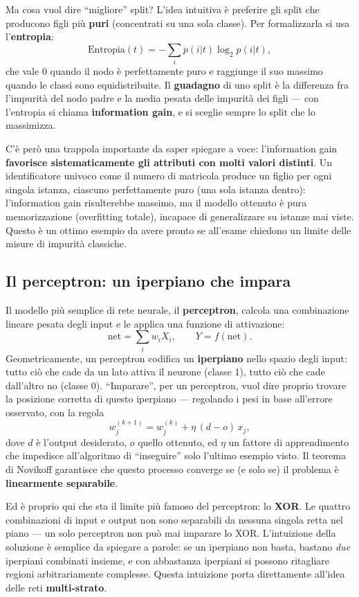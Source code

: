 \documentclass[11pt,a4paper]{article}
\begin{document}
Ma cosa vuol dire ``migliore'' split? L'idea intuitiva è preferire gli split che producono figli più \textbf{puri} (concentrati su una sola classe). Per formalizzarla si usa l'\textbf{entropia}:
\[
\text{Entropia}(t) = -\sum_i p(i|t)\log_2 p(i|t),
\]
che vale $0$ quando il nodo è perfettamente puro e raggiunge il suo massimo quando le classi sono equidistribuite. Il \textbf{guadagno} di uno split è la differenza fra l'impurità del nodo padre e la media pesata delle impurità dei figli --- con l'entropia si chiama \textbf{information gain}, e si sceglie sempre lo split che lo massimizza.

C'è però una trappola importante da saper spiegare a voce: l'information gain \textbf{favorisce sistematicamente gli attributi con molti valori distinti}. Un identificatore univoco come il numero di matricola produce un figlio per ogni singola istanza, ciascuno perfettamente puro (una sola istanza dentro): l'information gain risulterebbe massimo, ma il modello ottenuto è pura memorizzazione (overfitting totale), incapace di generalizzare su istanze mai viste. Questo è un ottimo esempio da avere pronto se all'esame chiedono un limite delle misure di impurità classiche.

\subsection{Il perceptron: un iperpiano che impara}

Il modello più semplice di rete neurale, il \textbf{perceptron}, calcola una combinazione lineare pesata degli input e le applica una funzione di attivazione:
\[
\text{net} = \sum_i w_i X_i, \qquad Y = f(\text{net}).
\]
Geometricamente, un perceptron codifica un \textbf{iperpiano} nello spazio degli input: tutto ciò che cade da un lato attiva il neurone (classe 1), tutto ciò che cade dall'altro no (classe 0). ``Imparare'', per un perceptron, vuol dire proprio trovare la posizione corretta di questo iperpiano --- regolando i pesi in base all'errore osservato, con la regola
\[
w_j^{(k+1)} = w_j^{(k)} + \eta\,(d-o)\,x_j,
\]
dove $d$ è l'output desiderato, $o$ quello ottenuto, ed $\eta$ un fattore di apprendimento che impedisce all'algoritmo di ``inseguire'' solo l'ultimo esempio visto. Il teorema di Novikoff garantisce che questo processo converge se (e solo se) il problema è \textbf{linearmente separabile}.

Ed è proprio qui che sta il limite più famoso del perceptron: lo \textbf{XOR}. Le quattro combinazioni di input e output non sono separabili da nessuna singola retta nel piano --- un solo perceptron non può mai imparare lo XOR. L'intuizione della soluzione è semplice da spiegare a parole: se un iperpiano non basta, bastano \emph{due} iperpiani combinati insieme, e con abbastanza iperpiani si possono ritagliare regioni arbitrariamente complesse. Questa intuizione porta direttamente all'idea delle reti \textbf{multi-strato}.
\end{document}
